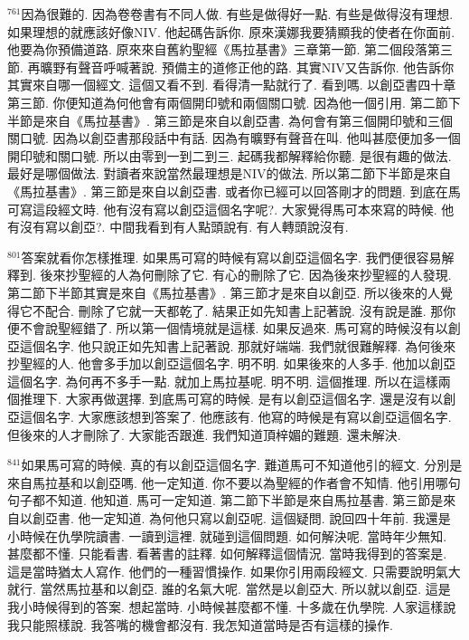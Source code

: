 \documentclass{book}
\begin{document}
$^{761}$因為很難的.
因為卷卷書有不同人做.
有些是做得好一點.
有些是做得沒有理想.
如果理想的就應該好像NIV.
他起碼告訴你.
原來漢娜我要猜顯我的使者在你面前.
他要為你預備道路.
原來來自舊約聖經《馬拉基書》三章第一節.
第二個段落第三節.
再曠野有聲音呼喊著說.
預備主的道修正他的路.
其實NIV又告訴你.
他告訴你其實來自哪一個經文.
這個又看不到.
看得清一點就行了.
看到嗎.
以創亞書四十章第三節.
你便知道為何他會有兩個開印號和兩個關口號.
因為他一個引用.
第二節下半節是來自《馬拉基書》.
第三節是來自以創亞書.
為何會有第三個開印號和三個關口號.
因為以創亞書那段話中有話.
因為有曠野有聲音在叫.
他叫甚麼便加多一個開印號和關口號.
所以由零到一到二到三.
起碼我都解釋給你聽.
是很有趣的做法.
最好是哪個做法.
對讀者來說當然最理想是NIV的做法.
所以第二節下半節是來自《馬拉基書》.
第三節是來自以創亞書.
或者你已經可以回答剛才的問題.
到底在馬可寫這段經文時.
他有沒有寫以創亞這個名字呢?.
大家覺得馬可本來寫的時候.
他有沒有寫以創亞?.
中間我看到有人點頭說有.
有人轉頭說沒有.

$^{801}$答案就看你怎樣推理.
如果馬可寫的時候有寫以創亞這個名字.
我們便很容易解釋到.
後來抄聖經的人為何刪除了它.
有心的刪除了它.
因為後來抄聖經的人發現.
第二節下半節其實是來自《馬拉基書》.
第三節才是來自以創亞.
所以後來的人覺得它不配合.
刪除了它就一天都乾了.
結果正如先知書上記著說.
沒有說是誰.
那你便不會說聖經錯了.
所以第一個情境就是這樣.
如果反過來.
馬可寫的時候沒有以創亞這個名字.
他只說正如先知書上記著說.
那就好端端.
我們就很難解釋.
為何後來抄聖經的人.
他會多手加以創亞這個名字.
明不明.
如果後來的人多手.
他加以創亞這個名字.
為何再不多手一點.
就加上馬拉基呢.
明不明.
這個推理.
所以在這樣兩個推理下.
大家再做選擇.
到底馬可寫的時候.
是有以創亞這個名字.
還是沒有以創亞這個名字.
大家應該想到答案了.
他應該有.
他寫的時候是有寫以創亞這個名字.
但後來的人才刪除了.
大家能否跟進.
我們知道頂梓媚的難題.
還未解決.

$^{841}$如果馬可寫的時候.
真的有以創亞這個名字.
難道馬可不知道他引的經文.
分別是來自馬拉基和以創亞嗎.
他一定知道.
你不要以為聖經的作者會不知情.
他引用哪句句子都不知道.
他知道.
馬可一定知道.
第二節下半節是來自馬拉基書.
第三節是來自以創亞書.
他一定知道.
為何他只寫以創亞呢.
這個疑問.
說回四十年前.
我還是小時候在仇學院讀書.
一讀到這裡.
就碰到這個問題.
如何解決呢.
當時年少無知.
甚麼都不懂.
只能看書.
看著書的註釋.
如何解釋這個情況.
當時我得到的答案是.
這是當時猶太人寫作.
他們的一種習慣操作.
如果你引用兩段經文.
只需要說明氣大就行.
當然馬拉基和以創亞.
誰的名氣大呢.
當然是以創亞大.
所以就以創亞.
這是我小時候得到的答案.
想起當時.
小時候甚麼都不懂.
十多歲在仇學院.
人家這樣說我只能照樣說.
我答嘴的機會都沒有.
我怎知道當時是否有這樣的操作.
\end{document}
